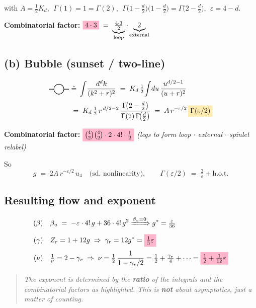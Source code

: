 \documentclass[11pt,a4paper]{article}
\newcommand{\hl}[1]{\colorbox{gunnaryellow}{$#1$}}
\newcommand{\hpink}[1]{\colorbox{gunnarpink}{$#1$}}
\newcommand{\sunset}{%
\begin{tikzpicture}[baseline=-0.5ex]
  \draw[thick] (-0.5,0)--(-0.25,0);
  \draw[thick] (0.25,0)--(0.5,0);
  \draw[thick] (0,0) circle (0.25);
\end{tikzpicture}}
\begin{document}
with $A=\tfrac12 K_d$, $\;\Gamma(1)=1=\Gamma(2)$, $\;\Gamma\!\big(1-\tfrac{d}{2}\big)\big(1-\tfrac{d}{2}\big)=\Gamma\!\big(2-\tfrac{d}{2}\big)$, $\;\varepsilon=4-d$.

\medskip
\textbf{Combinatorial factor:} $\hpink{4\cdot 3} \;=\; \underbrace{\tfrac{4\cdot 3}{2}}_{\text{loop}}\cdot \underbrace{2}_{\text{external}}$

\subsection*{(b) Bubble (sunset / two-line)}

\begin{align*}
\sunset \;&\hat{=}\; \int\!\frac{d^d k}{(k^2+r)^2} \;=\; K_d\,\tfrac{1}{2}\!\int\!du\,\frac{u^{d/2-1}}{(u+r)^2} \\[2pt]
&=\; K_d\,\tfrac{1}{2}\,r^{\,d/2-2}\,\frac{\Gamma\!\big(2-\tfrac{d}{2}\big)}{\Gamma(2)\,\Gamma\!\big(\tfrac{d}{2}\big)}
\;=\; A\,r^{-\varepsilon/2}\,\hl{\Gamma(\varepsilon/2)}
\end{align*}

\medskip
\textbf{Combinatorial factor:} $\hpink{\binom{4}{2}\binom{4}{2}\cdot 2 \cdot 4!\cdot \tfrac{1}{2}}$
\;\;\textit{(legs to form loop $\cdot$ external $\cdot$ spinlet relabel)}

So
\[
g \;=\; 2A\,r^{-\varepsilon/2}\,u_4 \quad\text{(sd. nonlinearity)}, \qquad \Gamma(\varepsilon/2) \;=\; \tfrac{2}{\varepsilon} + \text{h.o.t.}
\]

\subsection*{Resulting flow and exponent}

\begin{align*}
(\beta) \quad & \beta_u \;=\; -\varepsilon\cdot 4!\,g + 36\cdot 4!\,g^2 \xRightarrow{\beta_u=0} g^* = \tfrac{\varepsilon}{36}\\[2pt]
(\gamma) \quad & Z_r = 1 + 12g \;\Rightarrow\; \gamma_r = 12 g^* = \hpink{\tfrac{1}{3}\varepsilon}\\[2pt]
(\nu)\quad & \tfrac{1}{\nu} = 2-\gamma_r \;\Rightarrow\; \nu = \tfrac{1}{2}\,\frac{1}{1-\gamma_r/2} = \tfrac{1}{2}+\tfrac{\gamma_r}{4}+\dots = \hpink{\tfrac{1}{2}+\tfrac{1}{12}\varepsilon}
\end{align*}

\begin{quote}\itshape
The exponent is determined by the \textbf{ratio} of the integrals and the combinatorial factors as highlighted. This is \textbf{not} about asymptotics, just a matter of counting.
\end{quote}
\end{document}
